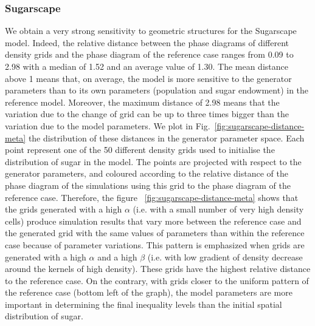\documentclass{JASSS}
\begin{document}
\subsubsection{Sugarscape} 



We obtain a very strong sensitivity to geometric structures for the Sugarscape model. Indeed, the relative distance between the phase diagrams of different density grids and the phase diagram of the reference case ranges from 0.09 to 2.98 with a median of 1.52 and an average value of 1.30. The mean distance above 1 means that, on average, the model is more sensitive to the generator parameters than to its own parameters (population and sugar endowment) in the reference model. Moreover, the maximum distance of 2.98 means that the variation due to the change of grid can be up to three times bigger than the variation due to the model parameters. We plot in Fig.~\ref{fig:sugarscape-distance-meta} the distribution of these distances in the generator parameter space. Each point represent one of the 50 different density grids used to initialise the distribution of sugar in the model. The points are projected with respect to the generator parameters, and coloured according to the relative distance of the phase diagram of the simulations using this grid to the phase diagram of the reference case. Therefore, the figure ~\ref{fig:sugarscape-distance-meta} shows that the grids generated with a high $\alpha$ (i.e. with a small number of very high density cells) produce simulation results that vary more between the reference case and the generated grid with the same values of parameters than within the reference case because of parameter variations. This pattern is emphasized when grids are generated with a high $\alpha$ and a high $\beta$ (i.e. with low gradient of density decrease around the kernels of high density). These grids have the highest relative distance to the reference case. On the contrary, with grids closer to the uniform pattern of the reference case (bottom left of the graph), the model parameters are more important in determining the final inequality levels than the initial spatial distribution of sugar. 
\end{document}
